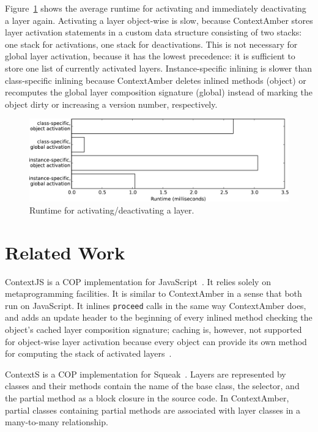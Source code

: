 \documentclass{sig-alternate}
\begin{document}
Figure~\ref{fig:activation} shows the average runtime for activating and immediately deactivating a layer again. Activating a layer object-wise is slow, because ContextAmber stores layer activation statements in a custom data structure consisting of two stacks: one stack for activations, one stack for deactivations. This is not necessary for global layer activation, because it has the lowest precedence: it is sufficient to store one list of currently
activated layers. Instance-specific inlining is slower than class-specific inlining because ContextAmber deletes inlined methods (object) or recomputes the global layer composition signature (global) instead of marking the object dirty or increasing a version number, respectively.

\begin{figure}[t]
    \includegraphics[width=\columnwidth]{activation_ms.pdf}
    \caption{Runtime for activating/deactivating a layer.}
    \label{fig:activation}
\end{figure}

\section{Related Work}
ContextJS is a COP implementation for JavaScript~\cite{Lincke:2011:OIC:1998661.1998804}. It relies solely on metaprogramming facilities. It is similar to ContextAmber in a sense that both run on JavaScript. It inlines \texttt{proceed} calls in the same way ContextAmber does, and adds an update header to the beginning of every inlined method checking the object's cached layer composition signature; caching is, however, not supported for object-wise layer activation because every object can provide its own method for computing the stack of activated layers~\cite{Krahn:2012:ELA:2223947.2223971}.

ContextS is a COP implementation for Squeak~\cite{Hirschfeld:2007:ICP:1462618.1462629}. Layers are represented by classes and their methods contain the name of the base class, the selector, and the partial method as a block closure in the source code. In ContextAmber, partial classes containing partial methods are associated with layer classes in a many-to-many relationship.
\end{document}
